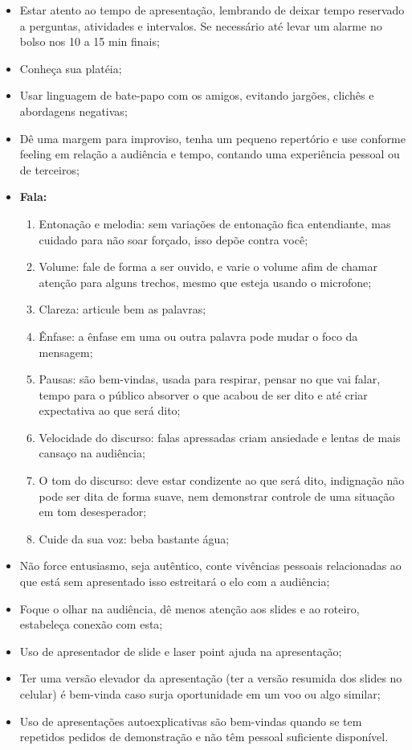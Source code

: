 \begin{itemize}
    \item Estar atento ao tempo de apresentação, lembrando de deixar tempo reservado a perguntas, atividades e intervalos. Se necessário até levar um alarme no bolso nos 10 a 15 min finais;
    \item Conheça sua platéia; 
    \item Usar linguagem de bate-papo com os amigos, evitando jargões, clichês e abordagens negativas;
    \item Dê uma margem para improviso, tenha um pequeno repertório e use conforme feeling em relação a audiência e tempo, contando uma experiência pessoal ou de terceiros;
    \item \textbf{Fala:} 
     \begin{enumerate}
        \item Entonação e melodia: sem variações de entonação fica entendiante, mas cuidado para não soar forçado, isso depõe contra você; 
        \item Volume: fale de forma a ser ouvido, e varie o volume afim de chamar atenção para alguns trechos, mesmo que esteja usando o microfone; 
        \item Clareza: articule bem as palavras; 
        \item Ênfase: a ênfase em uma ou outra palavra pode mudar o foco da mensagem; 
        \item Pausas: são bem-vindas, usada para respirar, pensar no que vai falar, tempo para o público absorver o que acabou de ser dito e até criar expectativa ao que será dito; 
        \item Velocidade do discurso: falas apressadas criam ansiedade e lentas de mais cansaço na audiência; 
        \item O tom do discurso: deve estar condizente ao que será dito, indignação não pode ser dita de forma suave, nem demonstrar controle de uma situação em tom desesperador;
        \item Cuide da sua voz: beba bastante água;  
     \end{enumerate}
    \item Não force entusiasmo, seja autêntico, conte vivências pessoais relacionadas ao que está sem apresentado isso estreitará o elo com a audiência;
    \item Foque o olhar na audiência, dê menos atenção aos slides e ao roteiro, estabeleça conexão com esta;
    \item Uso de apresentador de slide e laser point ajuda na apresentação;
    \item Ter uma versão elevador da apresentação (ter a versão resumida dos slides no celular) é bem-vinda caso surja oportunidade em um voo ou algo similar;
    \item  Uso de apresentações autoexplicativas são bem-vindas quando se tem repetidos pedidos de demonstração e não têm pessoal suficiente disponível.
\end{itemize}



